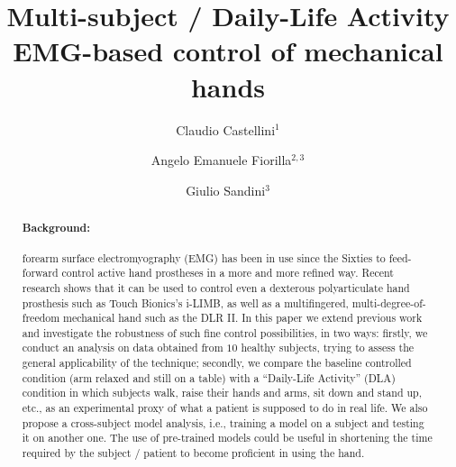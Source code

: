 \documentclass[10pt]{bmc_article}
\newenvironment{bmcformat}
  {\begin{raggedright}\baselineskip20pt\sloppy\setboolean{publ}{false}}
  {\end{raggedright}\baselineskip20pt\sloppy}
\begin{document}
\begin{bmcformat}

\title{Multi-subject / Daily-Life Activity\\EMG-based control of mechanical hands}
 
\author{%
  Claudio Castellini\correspondingauthor$^1$%
\and
  Angelo Emanuele Fiorilla$^{2,3}$%
\and
  Giulio Sandini$^3$%
}%

\address{%
    \iid(1)LIRA-Lab, University of Genova, viale F. Causa 13, 16145 Genova, Italy\\
    \iid(2)DIST, University of Genova, viale F. Causa 13, 16145 Genova, Italy\\
    \iid(3)Italian Institute of Technology, via Morego 30, 16163 Genova, Italy
}%

\maketitle

\begin{abstract}

\paragraph*{Background:}

forearm surface electromyography (EMG) has been in use since the Sixties
to feed-forward control active hand prostheses in a more and more refined way.
Recent research shows that it can be used to control even a dexterous
polyarticulate hand prosthesis such as Touch Bionics's i-LIMB,
as well as a multifingered, multi-degree-of-freedom mechanical hand such
as the DLR II. In this paper we extend previous work and investigate
the robustness of such fine control possibilities, in two ways: firstly,
we conduct an analysis on data obtained from $10$ healthy subjects, trying
to assess the general applicability of the technique; secondly, we compare
the baseline controlled condition (arm relaxed and still on a table) with
a ``Daily-Life Activity'' (DLA) condition in which subjects walk, raise
their hands and arms, sit down and stand up, etc., as an experimental proxy
of what a patient is supposed to do in real life.
We also propose a cross-subject model analysis,
i.e., training a model on a subject and testing it on another one. The use
of pre-trained models could be useful in shortening the time required by
the subject / patient to become proficient in using the hand.


\end{abstract}
\end{bmcformat}
\end{document}
